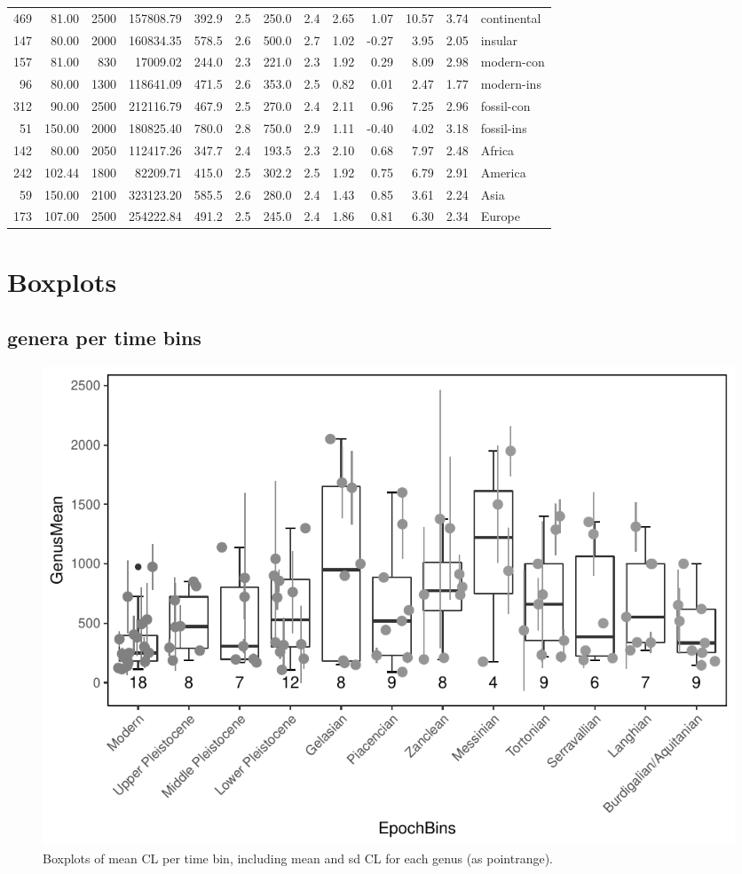 \documentclass[]{article}
\begin{document}
\begin{longtable}[]{@{}rrrrrrrrrrrrl@{}}
469 & 81.00 & 2500 & 157808.79 & 392.9 & 2.5 & 250.0 & 2.4 & 2.65 & 1.07
& 10.57 & 3.74 & continental\tabularnewline
147 & 80.00 & 2000 & 160834.35 & 578.5 & 2.6 & 500.0 & 2.7 & 1.02 &
-0.27 & 3.95 & 2.05 & insular\tabularnewline
157 & 81.00 & 830 & 17009.02 & 244.0 & 2.3 & 221.0 & 2.3 & 1.92 & 0.29 &
8.09 & 2.98 & modern-con\tabularnewline
96 & 80.00 & 1300 & 118641.09 & 471.5 & 2.6 & 353.0 & 2.5 & 0.82 & 0.01
& 2.47 & 1.77 & modern-ins\tabularnewline
312 & 90.00 & 2500 & 212116.79 & 467.9 & 2.5 & 270.0 & 2.4 & 2.11 & 0.96
& 7.25 & 2.96 & fossil-con\tabularnewline
51 & 150.00 & 2000 & 180825.40 & 780.0 & 2.8 & 750.0 & 2.9 & 1.11 &
-0.40 & 4.02 & 3.18 & fossil-ins\tabularnewline
142 & 80.00 & 2050 & 112417.26 & 347.7 & 2.4 & 193.5 & 2.3 & 2.10 & 0.68
& 7.97 & 2.48 & Africa\tabularnewline
242 & 102.44 & 1800 & 82209.71 & 415.0 & 2.5 & 302.2 & 2.5 & 1.92 & 0.75
& 6.79 & 2.91 & America\tabularnewline
59 & 150.00 & 2100 & 323123.20 & 585.5 & 2.6 & 280.0 & 2.4 & 1.43 & 0.85
& 3.61 & 2.24 & Asia\tabularnewline
173 & 107.00 & 2500 & 254222.84 & 491.2 & 2.5 & 245.0 & 2.4 & 1.86 &
0.81 & 6.30 & 2.34 & Europe\tabularnewline
\bottomrule
\end{longtable}

\newpage

\section{Boxplots}\label{boxplots}

\subsection{genera per time bins}\label{genera-per-time-bins}

\begin{figure}[htbp]
\centering
\includegraphics{MA_JJ_files/figure-latex/BPGBins-1.pdf}
\caption{Boxplots of mean CL per time bin, including mean and sd CL for
each genus (as pointrange).}
\end{figure}
\end{document}
